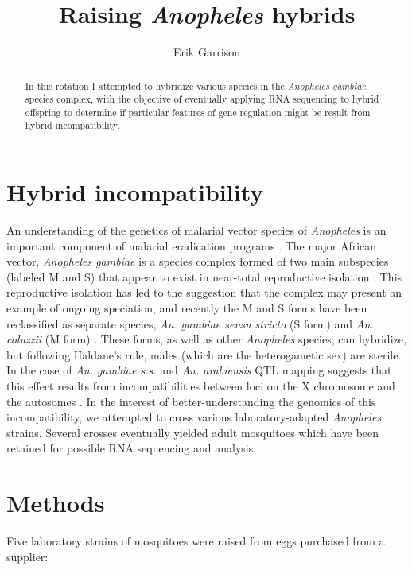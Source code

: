 \documentclass{article}
\begin{document}
\title{Raising \emph{Anopheles} hybrids}

\author{Erik Garrison}

\maketitle

\begin{abstract}
In this rotation I attempted to hybridize various species in the \emph{Anopheles gambiae} species complex, with the objective of eventually applying RNA sequencing to hybrid offspring to determine if particular features of gene regulation might be result from hybrid incompatibility.
\end{abstract}


\section{Hybrid incompatibility}

An understanding of the genetics of malarial vector species of \emph{Anopheles} is an important component of malarial eradication programs \cite{pmid25554792}. The major African vector, \emph{Anopheles gambiae} is a species complex formed of two main subspecies (labeled M and S) that appear to exist in near-total reproductive isolation  \cite{lanzaro2013speciation}.
This reproductive isolation has led to the suggestion that the complex may present an example of ongoing speciation, and recently the M and S forms have been reclassified as separate species, \emph{An. gambiae sensu stricto} (S form) and \emph{An. coluzzii} (M form) \cite{pmid26131476}.
These forms, as well as other \emph{Anopheles} species, can hybridize, but following Haldane's rule, males (which are the heterogametic sex) are sterile. In the case of \emph{An. gambiae s.s.} and \emph{An. arabiensis} QTL mapping suggests that this effect results from incompatibilities between loci on the X chromosome and the autosomes \cite{slotman2004genetics}.
In the interest of better-understanding the genomics of this incompatibility, we attempted to cross various laboratory-adapted \emph{Anopheles} strains. Several crosses eventually yielded adult mosquitoes which have been retained for possible RNA sequencing and analysis.

\section{Methods}

Five laboratory strains of mosquitoes were raised from eggs purchased from a supplier:
\end{document}
